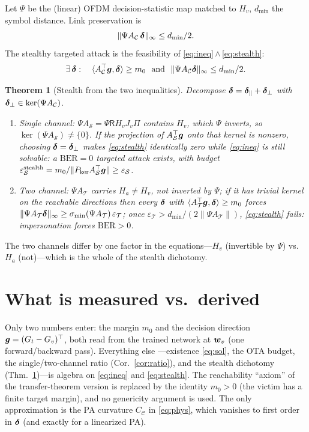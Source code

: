 \documentclass[11pt]{article}
\newtheorem{theorem}{Theorem}\newtheorem{corollary}[theorem]{Corollary}
\newcommand{\norm}[1]{\lVert #1\rVert}\newcommand{\Rx}{\mathsf{R}}
\begin{document}
Let $\Psi$ be the (linear) OFDM decision-statistic map matched to $H_v$, $d_{\min}$ the symbol
distance. Link preservation is
\begin{equation}\label{eq:stealth}
  \norm{\Psi A_{\mathcal C}\,\bd}_\infty\le d_{\min}/2 .
\end{equation}
The stealthy targeted attack is the feasibility of \eqref{eq:ineq}\,$\wedge$\,\eqref{eq:stealth}:
\[
  \exists\,\bd:\quad \langle A_{\mathcal C}^\top\bg,\bd\rangle\ge m_0
  \ \ \text{and}\ \ \norm{\Psi A_{\mathcal C}\bd}_\infty\le d_{\min}/2 .
\]
\begin{theorem}[Stealth from the two inequalities]\label{thm:stealth}
Decompose $\bm\delta=\bm\delta_\parallel+\bm\delta_\perp$ with $\bm\delta_\perp\in\ker(\Psi A_{\mathcal C})$.
\begin{enumerate}
\item[\textbf{(S)}] Single channel: $\Psi A_{\mathcal S}=\Psi\Rx H_v J_v\Pi$ contains $H_v$, which
$\Psi$ inverts, so $\ker(\Psi A_{\mathcal S})\neq\{0\}$. If the projection of
$A_{\mathcal S}^\top\bm g$ onto that kernel is nonzero, choosing $\bm\delta=\bm\delta_\perp$ makes
\eqref{eq:stealth} \emph{identically zero} while \eqref{eq:ineq} is still solvable: a
$\mathrm{BER}=0$ targeted attack exists, with budget
$\varepsilon_{\mathcal S}^{\mathrm{stealth}}=m_0/\norm{P_{\ker}A_{\mathcal S}^\top\bg}\ge\varepsilon_{\mathcal S}$.
\item[\textbf{(T)}] Two channel: $\Psi A_{\mathcal T}$ carries $H_a\neq H_v$, not inverted by
$\Psi$; if it has trivial kernel on the reachable directions then every $\bm\delta$ with
$\langle A_{\mathcal T}^\top\bm g,\bm\delta\rangle\ge m_0$ forces
$\norm{\Psi A_{\mathcal T}\bd}_\infty\ge \sigma_{\min}(\Psi A_{\mathcal T})\,\varepsilon_{\mathcal T}$;
once $\varepsilon_{\mathcal T}>d_{\min}/(2\norm{\Psi A_{\mathcal T}})$, \eqref{eq:stealth} fails:
impersonation forces $\mathrm{BER}>0$.
\end{enumerate}
\end{theorem}
\noindent The two channels differ by one factor in the equations---$H_v$ (invertible by $\Psi$)
vs.\ $H_a$ (not)---which is the whole of the stealth dichotomy.

\section*{What is measured vs.\ derived}
Only two numbers enter: the margin $m_0$ and the decision direction $\bm g=(G_t-G_v)^\top$, both
read from the trained network at $\bm w_v$ (one forward/backward pass). Everything else
---existence \eqref{eq:sol}, the OTA budget, the single/two-channel ratio (Cor.~\ref{cor:ratio}),
and the stealth dichotomy (Thm.~\ref{thm:stealth})---is algebra on \eqref{eq:ineq} and
\eqref{eq:stealth}. The reachability ``axiom'' of the transfer-theorem version is replaced by the
identity $m_0>0$ (the victim has a finite target margin), and no genericity argument is used. The
only approximation is the PA curvature $C_{\mathcal C}$ in \eqref{eq:phys}, which vanishes to first
order in $\bm\delta$ (and exactly for a linearized PA).
\end{document}
